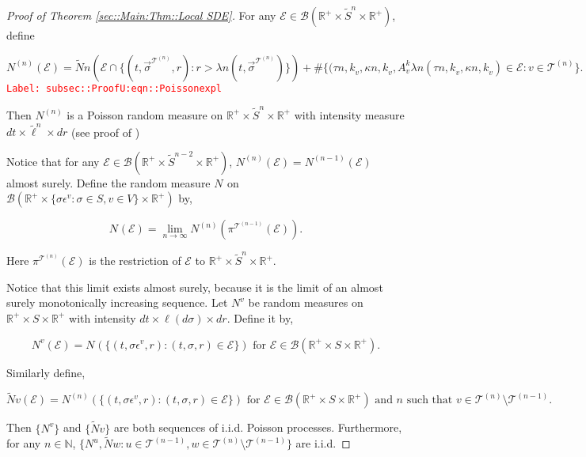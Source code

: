\documentclass[12pt]{article}
\newcommand{\mb}{\mathbb}
\newcommand{\mc}{\mathcal}
\newcommand{\ms}{\mathscr}
\newcommand{\ra}{\rightarrow}
\newcommand{\te}{\text}
\newcommand{\ep}{\epsilon}
\newcommand{\tr}{\textcolor{red}}
\newcommand{\labe}[1]{\tr{\texttt{Label: #1}}}
\newcommand{\ind}{\hspace{24pt}}
\renewcommand{\v}{v}							%
\newcommand{\vv}{u}								%
\newcommand{\vvv}{w}							%
\renewcommand{\S}{S}							%
\newcommand{\s}{\sigma}							%
\newcommand{\sv}{\vec{\s}}						%
\newcommand{\ev}{\ep}							%
\renewcommand{\t}{t}							%
\newcommand{\proj}{\pi}							%
\newcommand{\vind}[1]{^{#1}}					%
\newcommand{\vsi}[1]{^{#1}}						%
\newcommand{\cind}[1]{_{#1}}					%
\newcommand{\ts}[1]{_{#1}}						%
\newcommand{\tree}{\mc{T}}						%
\newcommand{\sln}[1]{^{(#1)}}						%
\newcommand{\poiss}{N}							%
\newcommand{\Sm}{\ell}							%
\newcommand{\rate}{\lambda}						%
\renewcommand{\r}{r}							%
\newcommand{\alt}[1]{\widetilde{#1}}			%
\newcommand{\rt}{\tau}							%
\renewcommand{\it}{k}							%
\newcommand{\evnt}{\mc{E}}						%
\newcommand{\rv}{A}								%
\renewcommand{\mark}{\kappa}					%
\begin{document}
\begin{proof}[Proof of Theorem \ref{sec::Main:Thm::Local SDE}]
For any \(\evnt{} \in \ms{B}(\mb{R}^+\times\alt{\S}^n\times\mb{R}^+)\), define

\begin{equation}
\poiss\sln{n}(\evnt{}) = \alt{\poiss}{n}\left(\evnt{}\cap\{(\t,\sv\cind{}\vsi{\tree\sln{n}},\r):\r > \rate{n}(\t,\sv\cind{}\vsi{\tree\sln{n}})\}\right) + \#\{(\rt{n,\it}_\v,\mark{n,\it}_\v,\rv_{\v}^{\it}\rate{n}(\rt{n,\it}_\v,\mark{n,\it}_\v) \in \evnt{}: \v\in \tree\sln{n}\}.
\label{subsec::ProofU:eqn::Poissonexpl}
\end{equation}
\labe{subsec::ProofU:eqn::Poissonexpl}

Then \(\poiss\sln{n}\) is a Poisson random measure on \(\mb{R}^+\times\alt{\S}^n\times \mb{R}^+\) with intensity measure \(d\t\times \alt{\Sm}^n\times d\r\) (see proof of \cite[Theorem 14.7.1(b)]{DalVer08})

\ind Notice that for any \(\evnt{} \in \ms{B}(\mb{R}^+\times \alt{\S}^{n-2}\times \mb{R}^+)\), \(\poiss\sln{n}(\evnt{}) = \poiss\sln{n-1}(\evnt{})\) almost surely. Define the random measure \(\poiss\vind{}\) on \(\ms{B}(\mb{R}^+\times \{\s\ev\vind{\v}:\s\in \S,\v \in V\}\times \mb{R}^+)\) by,

\[\poiss\vind{}(\evnt{}) = \lim_{n \ra\infty}\poiss\sln{n}\left(\proj\vsi{\tree\sln{n-1}}\ts{}(\evnt{})\right).\]

Here \(\proj\vsi{\tree\sln{n}}\ts{}(\evnt{})\) is the restriction of \(\evnt{}\) to \(\mb{R}^+\times \alt{\S}^n\times\mb{R}^+\). 

\ind Notice that this limit exists almost surely, because it is the limit of an almost surely monotonically increasing sequence. Let \(\poiss\vind{\v}\) be random measures on \(\mb{R}^+\times\S\times\mb{R}^+\) with intensity \(d\t\times\Sm(d\s)\times d\r\). Define it by,

\[\poiss\vind{\v}(\evnt{}) = \poiss\vind{}\left(\{(\t,\s\ev\vind{\v},\r):(\t,\s,\r)\in \evnt{}\}\right) \te{ for } \evnt{} \in \ms{B}(\mb{R}^+\times\S\times\mb{R}^+).\]

Similarly define,

\[\alt{\poiss}{\v}(\evnt{}) = \poiss\sln{n}\left(\{(\t,\s\ev\vind{\v},\r):(\t,\s,\r)\in \evnt{}\}\right)\te{ for } \evnt{} \in \ms{B}(\mb{R}^+\times\S\times\mb{R}^+)\te{ and }n\te{ such that } \v\in \tree\sln{n}\setminus\tree\sln{n-1}.\]

Then \(\{\poiss\vind{\v}\}\) and \(\{\alt{\poiss}{\v}\}\) are both sequences of i.i.d. Poisson processes. Furthermore, for any \(n \in \mb{N}\), \(\{\poiss\vind{\vv},\alt{\poiss}{\vvv}:\vv\in \tree\sln{n-1},\vvv\in\tree\sln{n}\setminus\tree\sln{n-1}\}\) are i.i.d.


\end{proof}
\end{document}
